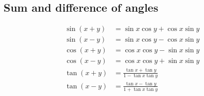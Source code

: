 \subsection*{Sum and difference of angles}

\begin{align*}
  \sin(x + y) &= \sin x \cos y + \cos x \sin y\\
  \sin(x - y) &= \sin x \cos y - \cos x \sin y\\
  \cos(x + y) &= \cos x \cos y - \sin x \sin y\\
  \cos(x - y) &= \cos x \cos y + \sin x \sin y\\
  \tan(x + y) &= \frac{\tan x + \tan y}{1 - \tan x \tan y}\\
  \tan(x - y) &= \frac{\tan x - \tan y}{1 + \tan x \tan y}
\end{align*}